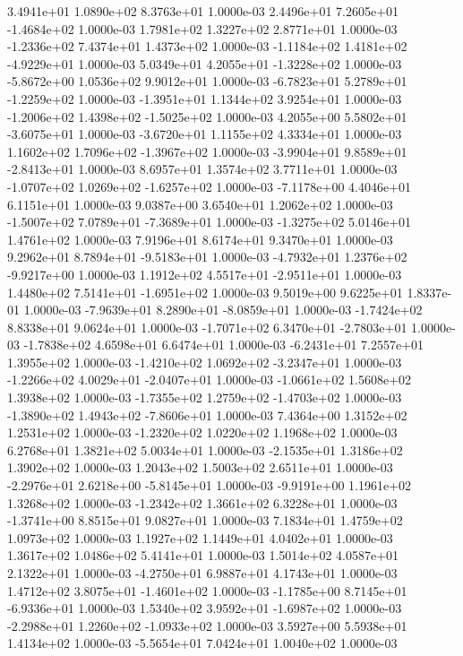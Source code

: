 3.4941e+01 1.0890e+02 8.3763e+01  1.0000e-03
 2.4496e+01  7.2605e+01 -1.4684e+02  1.0000e-03
1.7981e+02 1.3227e+02 2.8771e+01  1.0000e-03
-1.2336e+02  7.4374e+01  1.4373e+02  1.0000e-03
-1.1184e+02  1.4181e+02 -4.9229e+01  1.0000e-03
 5.0349e+01  4.2055e+01 -1.3228e+02  1.0000e-03
-5.8672e+00  1.0536e+02  9.9012e+01  1.0000e-03
-6.7823e+01  5.2789e+01 -1.2259e+02  1.0000e-03
-1.3951e+01  1.1344e+02  3.9254e+01  1.0000e-03
-1.2006e+02  1.4398e+02 -1.5025e+02  1.0000e-03
 4.2055e+00  5.5802e+01 -3.6075e+01  1.0000e-03
-3.6720e+01  1.1155e+02  4.3334e+01  1.0000e-03
 1.1602e+02  1.7096e+02 -1.3967e+02  1.0000e-03
-3.9904e+01  9.8589e+01 -2.8413e+01  1.0000e-03
8.6957e+01 1.3574e+02 3.7711e+01  1.0000e-03
-1.0707e+02  1.0269e+02 -1.6257e+02  1.0000e-03
-7.1178e+00  4.4046e+01  6.1151e+01  1.0000e-03
9.0387e+00 3.6540e+01 1.2062e+02  1.0000e-03
-1.5007e+02  7.0789e+01 -7.3689e+01  1.0000e-03
-1.3275e+02  5.0146e+01  1.4761e+02  1.0000e-03
7.9196e+01 8.6174e+01 9.3470e+01  1.0000e-03
 9.2962e+01  8.7894e+01 -9.5183e+01  1.0000e-03
-4.7932e+01  1.2376e+02 -9.9217e+00  1.0000e-03
 1.1912e+02  4.5517e+01 -2.9511e+01  1.0000e-03
 1.4480e+02  7.5141e+01 -1.6951e+02  1.0000e-03
9.5019e+00 9.6225e+01 1.8337e-01  1.0000e-03
-7.9639e+01  8.2890e+01 -8.0859e+01  1.0000e-03
-1.7424e+02  8.8338e+01  9.0624e+01  1.0000e-03
-1.7071e+02  6.3470e+01 -2.7803e+01  1.0000e-03
-1.7838e+02  4.6598e+01  6.6474e+01  1.0000e-03
-6.2431e+01  7.2557e+01  1.3955e+02  1.0000e-03
-1.4210e+02  1.0692e+02 -3.2347e+01  1.0000e-03
-1.2266e+02  4.0029e+01 -2.0407e+01  1.0000e-03
-1.0661e+02  1.5608e+02  1.3938e+02  1.0000e-03
-1.7355e+02  1.2759e+02 -1.4703e+02  1.0000e-03
-1.3890e+02  1.4943e+02 -7.8606e+01  1.0000e-03
7.4364e+00 1.3152e+02 1.2531e+02  1.0000e-03
-1.2320e+02  1.0220e+02  1.1968e+02  1.0000e-03
6.2768e+01 1.3821e+02 5.0034e+01  1.0000e-03
-2.1535e+01  1.3186e+02  1.3902e+02  1.0000e-03
1.2043e+02 1.5003e+02 2.6511e+01  1.0000e-03
-2.2976e+01  2.6218e+00 -5.8145e+01  1.0000e-03
-9.9191e+00  1.1961e+02  1.3268e+02  1.0000e-03
-1.2342e+02  1.3661e+02  6.3228e+01  1.0000e-03
-1.3741e+00  8.8515e+01  9.0827e+01  1.0000e-03
7.1834e+01 1.4759e+02 1.0973e+02  1.0000e-03
1.1927e+02 1.1449e+01 4.0402e+01  1.0000e-03
1.3617e+02 1.0486e+02 5.4141e+01  1.0000e-03
1.5014e+02 4.0587e+01 2.1322e+01  1.0000e-03
-4.2750e+01  6.9887e+01  4.1743e+01  1.0000e-03
 1.4712e+02  3.8075e+01 -1.4601e+02  1.0000e-03
-1.1785e+00  8.7145e+01 -6.9336e+01  1.0000e-03
 1.5340e+02  3.9592e+01 -1.6987e+02  1.0000e-03
-2.2988e+01  1.2260e+02 -1.0933e+02  1.0000e-03
3.5927e+00 5.5938e+01 1.4134e+02  1.0000e-03
-5.5654e+01  7.0424e+01  1.0040e+02  1.0000e-03
